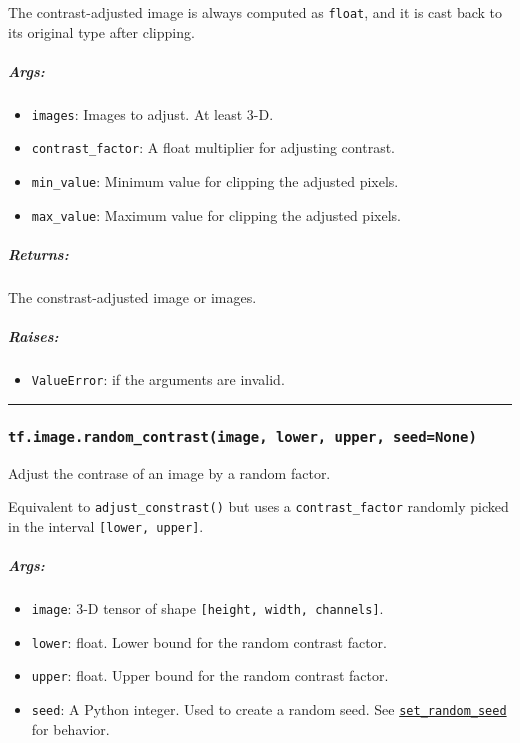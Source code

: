 The contrast-adjusted image is always computed as \texttt{float}, and it
is cast back to its original type after clipping.

\subparagraph{Args: }\label{args-21}

\begin{itemize}
\tightlist
\item
  \texttt{images}: Images to adjust. At least 3-D.
\item
  \texttt{contrast\_factor}: A float multiplier for adjusting contrast.
\item
  \texttt{min\_value}: Minimum value for clipping the adjusted pixels.
\item
  \texttt{max\_value}: Maximum value for clipping the adjusted pixels.
\end{itemize}

\subparagraph{Returns: }\label{returns-21}

The constrast-adjusted image or images.

\subparagraph{Raises: }\label{raises-10}

\begin{itemize}
\tightlist
\item
  \texttt{ValueError}: if the arguments are invalid.
\end{itemize}

\begin{center}\rule{0.5\linewidth}{\linethickness}\end{center}

\subsubsection{\texorpdfstring{\texttt{tf.image.random\_contrast(image,\ lower,\ upper,\ seed=None)}
}{tf.image.random\_contrast(image, lower, upper, seed=None) }}\label{tf.image.randomux5fcontrastimage-lower-upper-seednone}

Adjust the contrase of an image by a random factor.

Equivalent to \texttt{adjust\_constrast()} but uses a
\texttt{contrast\_factor} randomly picked in the interval
\texttt{{[}lower,\ upper{]}}.

\subparagraph{Args: }\label{args-22}

\begin{itemize}
\tightlist
\item
  \texttt{image}: 3-D tensor of shape
  \texttt{{[}height,\ width,\ channels{]}}.
\item
  \texttt{lower}: float. Lower bound for the random contrast factor.
\item
  \texttt{upper}: float. Upper bound for the random contrast factor.
\item
  \texttt{seed}: A Python integer. Used to create a random seed. See
  \href{../../api_docs/python/constant_op.md\#set_random_seed}{\texttt{set\_random\_seed}}
  for behavior.
\end{itemize}

